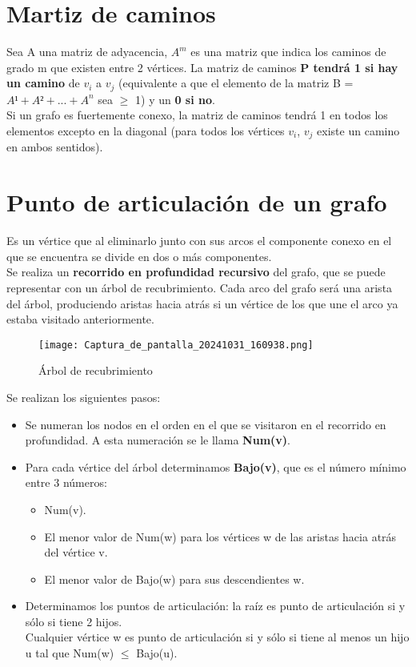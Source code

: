 \documentclass{article}
\begin{document}
\section{Martiz de caminos}
Sea A una matriz de adyacencia, $A^m$ es una matriz que indica los caminos de grado m que existen entre 2 vértices. La matriz de caminos \textbf{P tendrá 1 si hay un camino} de $v_i$ a $v_j$ (equivalente a que el elemento de la matriz B = $A¹+A²+...+A^n$ sea $\geq$ 1) y un \textbf{0 si no}. \\
Si un grafo es fuertemente conexo, la matriz de caminos tendrá 1 en todos los elementos excepto en la diagonal (para todos los vértices $v_i$, $v_j$ existe un camino en ambos sentidos).

\section{Punto de articulación de un grafo}
Es un vértice que al eliminarlo junto con sus arcos el componente conexo en el que se encuentra se divide en dos o más componentes. \\

Se realiza un \textbf{recorrido en profundidad recursivo} del grafo, que se puede representar con un
árbol de recubrimiento. Cada arco del grafo será una arista del árbol, produciendo aristas hacia
atrás si un vértice de los que une el arco ya estaba visitado anteriormente. \\

\begin{figure}[h]
    \centering
    \texttt{[image: Captura\_de\_pantalla\_20241031\_160938.png]}
    \caption{Árbol de recubrimiento}
    \label{fig:etiqueta}
\end{figure}

Se realizan los siguientes pasos: \\
\begin{itemize}
    \item Se numeran los nodos en el orden en el que se visitaron en el recorrido en profundidad. A esta numeración se le llama \textbf{Num(v)}.

    \item Para cada vértice del árbol determinamos \textbf{Bajo(v)}, que es el número mínimo entre 3 números:
        \begin{itemize}[label=-]
        \item Num(v).
        \item El menor valor de Num(w) para los vértices w de las aristas hacia atrás del vértice v.
        \item El menor valor de Bajo(w) para sus descendientes w.
        \end{itemize}

    \item Determinamos los puntos de articulación: la raíz es punto de articulación si y sólo si tiene 2 hijos. \\
    Cualquier vértice w es punto de articulación si y sólo si tiene al menos un hijo u tal que Num(w) $\leq$ Bajo(u).

\end{itemize}





\newpage
\end{document}
